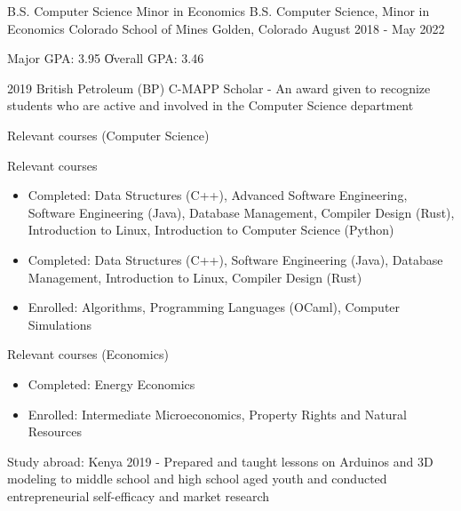 \vspace{-2.0mm}


\begin{cventries}

  \cventry
    {\ifcv B.S. Computer Science \newline \vspace{-1mm} Minor in Economics \else B.S. Computer Science, Minor in Economics \fi}
    {Colorado School of Mines} %
    {Golden, Colorado} %
    {August 2018 - May 2022} %
    {
      \begin{cvitems} %
        \item {Major GPA: 3.95 \| Overall GPA: 3.46}
    \item {2019 British Petroleum (BP) C-MAPP Scholar - An award given to recognize students who are active and involved in the Computer Science department}
        \ifcv
        \item {Relevant courses (Computer Science)}
        \else
        \item {Relevant courses}
        \fi
        \begin {itemize}
        \ifcv
               \item {Completed: Data Structures (C++), Advanced Software Engineering, Software
    Engineering (Java), Database Management, Compiler Design (Rust), Introduction to Linux, Introduction to Computer Science (Python)}
    \else
    \item {Completed: Data Structures (C++), Software
    Engineering (Java), Database Management, Introduction to Linux, Compiler Design (Rust)}
    \fi
        \item {Enrolled: Algorithms, Programming Languages (OCaml), Computer Simulations}
        \end {itemize}
        \ifcv
        \item {Relevant courses (Economics)}
        \begin{itemize}
          \item Completed: Energy Economics
          \item Enrolled: Intermediate Microeconomics, Property Rights and Natural Resources
        \end{itemize}
        \fi
    \ifcv
\item {Study abroad: Kenya 2019 - Prepared and taught lessons on Arduinos and 3D modeling to
middle school and high school aged youth and conducted entrepreneurial self-efficacy and market research }
\fi
      \end{cvitems}
    }
    {}
\end{cventries}